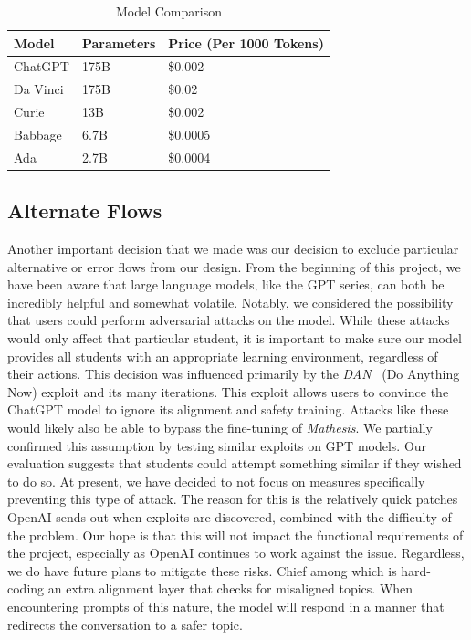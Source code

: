 \documentclass[12pt,a4paper]{article}
\begin{document}
    \begin{table}[H]
        \caption{Model Comparison\cite{openAiDocs}}
        \label{tab:modelComparison}
        \centering
        \begin{tabular}{|p{3cm}|p{3cm}|p{5cm}|}
            \hline
            \textbf{Model} & \textbf{Parameters} & \textbf{Price (Per 1000 Tokens)}\\
            \hline
            ChatGPT & 175B & \$0.002\\
            \hline
            Da Vinci & 175B & \$0.02\\
            \hline
            Curie & 13B & \$0.002\\
            \hline
            Babbage & 6.7B & \$0.0005\\
            \hline
            Ada & 2.7B & \$0.0004\\
            \hline
        \end{tabular}
    \end{table}

    \subsection{Alternate Flows}

    Another important decision that we made was our decision to exclude particular alternative or
    error flows from our design.  From the beginning of this project, we have been aware that
    large language models, like the GPT series, can both be incredibly helpful and somewhat volatile.
    Notably, we considered the possibility that users could perform adversarial attacks on the model.
    While these attacks would only affect that particular student, it is important to make sure
    our model provides all students with an appropriate learning environment, regardless of their actions.
    This decision was influenced primarily by the \textit{DAN}~\cite{danThread} (Do Anything Now)
    exploit and its many iterations.  This exploit allows users to convince the ChatGPT model to
    ignore its alignment and safety training.  Attacks like these would likely also be able to
    bypass the fine-tuning of \textit{Mathesis}.  We partially confirmed this assumption by testing
    similar exploits on GPT models.  Our evaluation suggests that students could attempt something
    similar if they wished to do so.  At present, we have decided to not focus on measures
    specifically preventing this type of attack.  The reason for this is the relatively quick
    patches OpenAI sends out when exploits are discovered, combined with the difficulty of the
    problem.  Our hope is that this will not impact the functional requirements of the project,
    especially as OpenAI continues to work against the issue.  Regardless, we do have future plans
    to mitigate these risks.  Chief among which is hard-coding an extra alignment layer that checks
    for misaligned topics.  When encountering prompts of this nature, the model will respond in a
    manner that redirects the conversation to a safer topic.
\end{document}

